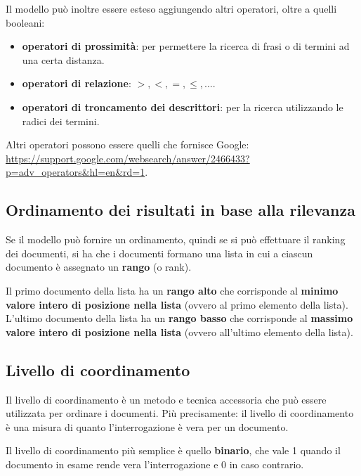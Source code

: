 Il modello può inoltre essere esteso aggiungendo altri operatori, oltre a quelli booleani:

\begin{itemize}
	\item \textbf{operatori di prossimità}: per permettere la ricerca di frasi o di termini ad una certa distanza.
	\item \textbf{operatori di relazione}: $>, <, =, \leq, \ldots$.
	\item \textbf{operatori di troncamento dei descrittori}: per la ricerca utilizzando le radici dei termini.
\end{itemize}

\noindent Altri operatori possono essere quelli che fornisce Google: \url{https://support.google.com/websearch/answer/2466433?p=adv_operators\&hl=en\&rd=1}.

\subsection{Ordinamento dei risultati in base alla rilevanza}

Se il modello può fornire un ordinamento, quindi se si può effettuare il ranking dei documenti, si ha che i documenti formano una lista in cui a ciascun documento è assegnato un \textbf{rango} (o rank).

Il primo documento della lista ha un \textbf{rango alto} che corrisponde al \textbf{minimo valore intero di posizione nella lista} (ovvero al primo elemento della lista). L'ultimo documento della lista ha un \textbf{rango basso} che corrisponde al \textbf{massimo valore intero di posizione nella lista} (ovvero all'ultimo elemento della lista).

\subsection{Livello di coordinamento}

Il livello di coordinamento è un metodo e tecnica accessoria che può essere utilizzata per ordinare i documenti.
Più precisamente: il livello di coordinamento è una misura di quanto l'interrogazione è vera per un documento.

Il livello di coordinamento più semplice è quello \textbf{binario}, che vale 1 quando il documento in esame rende vera l'interrogazione e 0 in caso contrario.

